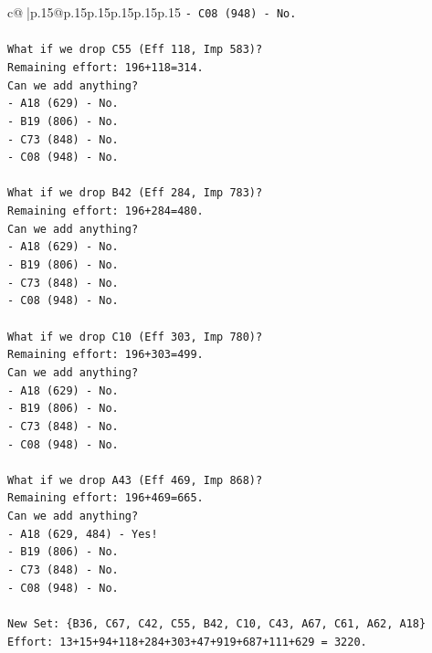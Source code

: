 \documentclass{article}
\begin{document}
{\begin{supertabular}{c@{$\;$}|p{.15\linewidth}@{}p{.15\linewidth}p{.15\linewidth}p{.15\linewidth}p{.15\linewidth}p{.15\linewidth}}
{{{\texttt{{-} C08 (948) {-} No.} \\
\\ 
\texttt{What if we drop C55 (Eff 118, Imp 583)?} \\
\texttt{Remaining effort: 196+118=314.} \\
\texttt{Can we add anything?} \\
\texttt{{-} A18 (629) {-} No.} \\
\texttt{{-} B19 (806) {-} No.} \\
\texttt{{-} C73 (848) {-} No.} \\
\texttt{{-} C08 (948) {-} No.} \\
\\ 
\texttt{What if we drop B42 (Eff 284, Imp 783)?} \\
\texttt{Remaining effort: 196+284=480.} \\
\texttt{Can we add anything?} \\
\texttt{{-} A18 (629) {-} No.} \\
\texttt{{-} B19 (806) {-} No.} \\
\texttt{{-} C73 (848) {-} No.} \\
\texttt{{-} C08 (948) {-} No.} \\
\\ 
\texttt{What if we drop C10 (Eff 303, Imp 780)?} \\
\texttt{Remaining effort: 196+303=499.} \\
\texttt{Can we add anything?} \\
\texttt{{-} A18 (629) {-} No.} \\
\texttt{{-} B19 (806) {-} No.} \\
\texttt{{-} C73 (848) {-} No.} \\
\texttt{{-} C08 (948) {-} No.} \\
\\ 
\texttt{What if we drop A43 (Eff 469, Imp 868)?} \\
\texttt{Remaining effort: 196+469=665.} \\
\texttt{Can we add anything?} \\
\texttt{{-} A18 (629, 484) {-} Yes!} \\
\texttt{{-} B19 (806) {-} No.} \\
\texttt{{-} C73 (848) {-} No.} \\
\texttt{{-} C08 (948) {-} No.} \\
\\ 
\texttt{New Set: \{B36, C67, C42, C55, B42, C10, C43, A67, C61, A62, A18\}} \\
\texttt{Effort: 13+15+94+118+284+303+47+919+687+111+629 = 3220.} \\
}}}
\end{supertabular}}
\end{document}
